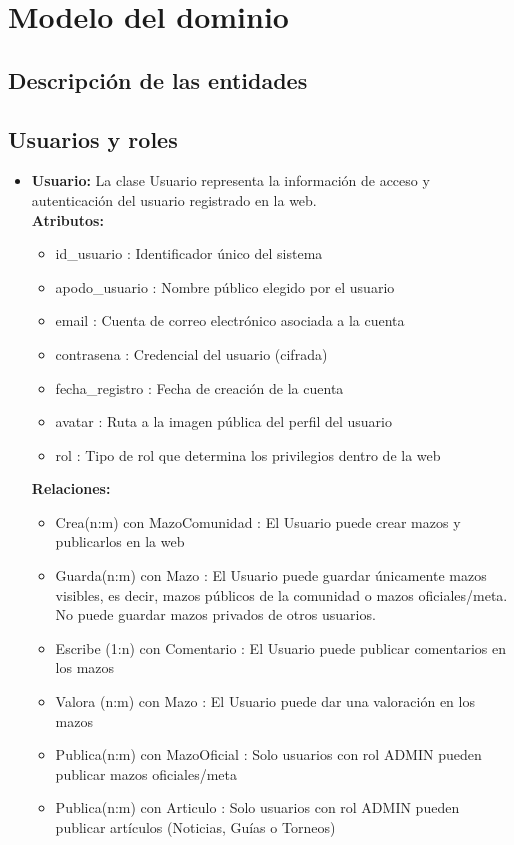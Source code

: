 \documentclass[10pt]{article}
\begin{document}
	\section{Modelo del dominio}
        \subsection*{Descripción de las entidades}
        
        \subsection{Usuarios y roles}
        \begin{itemize}
            \item \textbf{Usuario:} La clase Usuario representa la información de acceso y autenticación del usuario registrado en la web.\\
            \textbf{Atributos:}
            \begin{itemize}
                \item id\_usuario : Identificador único del sistema
                \item apodo\_usuario : Nombre público elegido por el usuario
                \item email : Cuenta de correo electrónico asociada a la cuenta
                \item contrasena : Credencial del usuario (cifrada)
                \item fecha\_registro : Fecha de creación de la cuenta
                \item avatar : Ruta a la imagen pública del perfil del usuario
                \item rol : Tipo de rol que determina los privilegios dentro de la web
            \end{itemize}
            
            \textbf{Relaciones:}
            \begin{itemize}
                \item Crea(n:m) con MazoComunidad : El Usuario puede crear mazos y publicarlos en la web
                \item Guarda(n:m) con Mazo : El Usuario puede guardar únicamente mazos visibles, es decir, mazos públicos de la comunidad o mazos oficiales/meta. No puede guardar mazos privados de otros usuarios.
                \item Escribe (1:n) con Comentario : El Usuario puede publicar comentarios en los mazos
                \item Valora (n:m) con Mazo : El Usuario puede dar una valoración en los mazos
                \item Publica(n:m) con MazoOficial : Solo usuarios con rol ADMIN pueden publicar mazos oficiales/meta
                \item Publica(n:m) con Articulo : Solo usuarios con rol ADMIN pueden publicar artículos (Noticias, Guías o Torneos)
            \end{itemize}
        \end{itemize}
        
\end{document}
